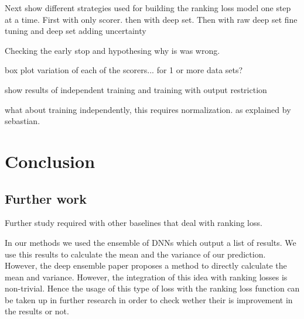 \documentclass[11pt]{report}
\begin{document}
Next show different strategies used for building the ranking loss model one step at a time.
First with only scorer.
then with deep set.
Then with raw deep set
fine tuning and deep set
adding uncertainty

Checking the early stop and hypothesing why is was wrong.

box plot variation of each of the scorers... for 1 or more data sets?

show results of independent training and training with output restriction

what about training independently,   this requires normalization. 
as explained by sebastian.

\chapter{Conclusion}


\section{Further work}
Further study required with other baselines that deal with ranking loss.

In our methods we used the ensemble of DNNs which output a list of results.
We use this results to calculate the mean and the variance of our  prediction.
However,  the deep ensemble paper proposes a method to directly calculate the mean
and variance.
However,  the integration of this idea with ranking losses is non-trivial.
Hence the usage of this type of loss with the ranking loss function can be taken up in further research in order to check wether their is improvement in the results or not.

 
\end{document}
